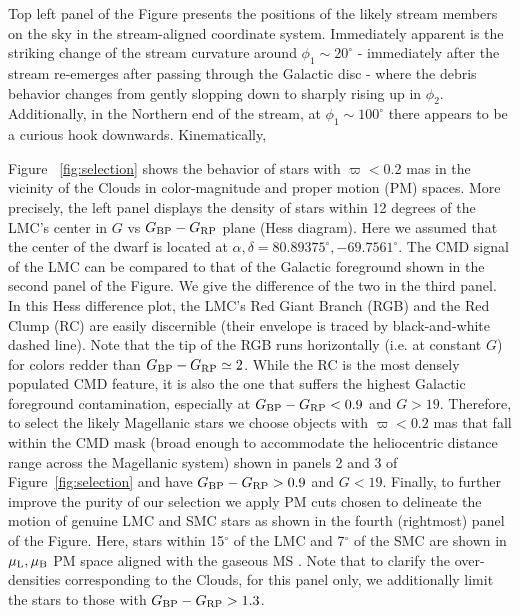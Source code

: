 \documentclass[a4paper,useAMS,usenatbib]{mnras}
\begin{document}
Top left panel of the Figure presents the positions of the likely
stream members on the sky in the stream-aligned coordinate
system. Immediately apparent is the striking change of the stream
curvature around $\phi_1\sim20^{\circ}$ - immediately after the stream
re-emerges after passing through the Galactic disc - where the debris
behavior changes from gently slopping down to sharply rising up in
$\phi_2$. Additionally, in the Northern end of the stream, at
$\phi_1\sim100^{\circ}$ there appears to be a curious hook
downwards. Kinematically, 

Figure ~\ref{fig:selection} shows the behavior of stars with
$\varpi<0.2$ mas in the vicinity of the Clouds in color-magnitude and
proper motion (PM) spaces. More precisely, the left panel displays the
density of stars within 12 degrees of the LMC's center in $G$ vs
$G_{\rm BP}-G_{\rm RP}$ plane (Hess diagram). Here we assumed that the
center of the dwarf is located at $\alpha, \delta =
80.89375^{\circ},-69.7561^{\circ}$. The CMD signal of the LMC can be
compared to that of the Galactic foreground shown in the second panel
of the Figure. We give the difference of the two in the third
panel. In this Hess difference plot, the LMC's Red Giant Branch (RGB)
and the Red Clump (RC) are easily discernible (their envelope is
traced by black-and-white dashed line). Note that the tip of the RGB
runs horizontally (i.e. at constant $G$) for colors redder than
$G_{\rm BP}-G_{\rm RP} \simeq 2$. While the RC is the most densely
populated CMD feature, it is also the one that suffers the highest
Galactic foreground contamination, especially at $G_{\rm BP}-G_{\rm
  RP}<0.9$ and $G>19$. Therefore, to select the likely Magellanic
stars we choose objects with $\varpi<0.2$ mas that fall within the CMD
mask (broad enough to accommodate the heliocentric distance range
across the Magellanic system) shown in panels 2 and 3 of
Figure~\ref{fig:selection} and have $G_{\rm BP}-G_{\rm RP}>0.9$ and
$G<19$. Finally, to further improve the purity of our selection we
apply PM cuts chosen to delineate the motion of genuine LMC and SMC
stars as shown in the fourth (rightmost) panel of the Figure. Here,
stars within 15$^{\circ}$ of the LMC and 7$^{\circ}$ of the SMC are
shown in $\mu_{\rm L}, \mu_{\rm B}$ PM space aligned with the gaseous
MS \citep[see][for the definition of the $L_{\rm MS}, B_{\rm MS}$
  coordinate system]{Nidever2008}. Note that to clarify the
over-densities corresponding to the Clouds, for this panel only, we
additionally limit the stars to those with $G_{\rm BP}-G_{\rm
  RP}>1.3$.
\end{document}
